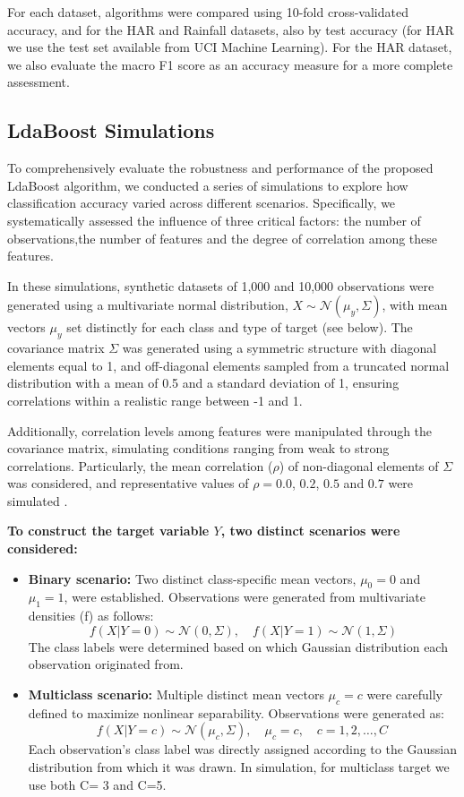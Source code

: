 \documentclass[11pt,a4paper]{article}
\begin{document}
For each dataset, algorithms were compared using 10-fold cross-validated accuracy, and for the HAR and Rainfall datasets, also by test accuracy (for HAR we use the test set available from UCI Machine Learning). 
For the HAR dataset, we also evaluate the macro F1 score as an accuracy measure for a more complete assessment.


\subsection*{LdaBoost Simulations}
To comprehensively evaluate the robustness and performance of the proposed LdaBoost algorithm, we conducted a series of simulations to explore how classification accuracy varied across different scenarios. Specifically, we systematically assessed the influence of three critical factors: the number of observations,the number of features and the degree of correlation among these features.

In these simulations, synthetic datasets of 1,000 and 10,000 observations were generated using a multivariate normal distribution, $X \sim \mathcal{N}(\mu_y, \Sigma)$, with mean vectors $\mu_y$ set distinctly for each class and type of target (see below). The covariance matrix $\Sigma$ was generated using a symmetric structure with diagonal elements equal to 1, and off-diagonal elements sampled from a truncated normal distribution with a mean of 0.5 and a standard deviation of 1, ensuring correlations within a realistic range between -1 and 1.

Additionally, correlation levels among features were manipulated through the covariance matrix, simulating conditions ranging from weak to strong correlations. Particularly, the mean correlation ($\rho$) of non-diagonal elements of $\Sigma$ was considered, and representative values of $\rho = 0.0$, $0.2$, $0.5$ and $0.7$ were simulated . 

\textbf{To construct the target variable $Y$, two distinct scenarios were considered:}

\begin{itemize}
    \item \textbf{Binary scenario:} Two distinct class-specific mean vectors, $\mu_0=0$ and $\mu_1=1$, were established. Observations were generated from multivariate densities (f) as follows:
    \[
    f(X|Y=0) \sim \mathcal{N}(0,\Sigma), \quad f(X|Y=1) \sim \mathcal{N}(1,\Sigma)
    \]
    The class labels were determined based on which Gaussian distribution each observation originated from.
    
    \item \textbf{Multiclass scenario:} Multiple distinct mean vectors $\mu_c = c$ were carefully defined to maximize nonlinear separability. Observations were generated as:
    \[
    f(X|Y=c) \sim \mathcal{N}(\mu_c,\Sigma),\quad \mu_c=c, \quad c = 1,2,\dots,C\
    \]
    Each observation's class label was directly assigned according to the Gaussian distribution from which it was drawn. In simulation, for multiclass target we use both C= 3 and C=5.
\end{itemize}
\end{document}
